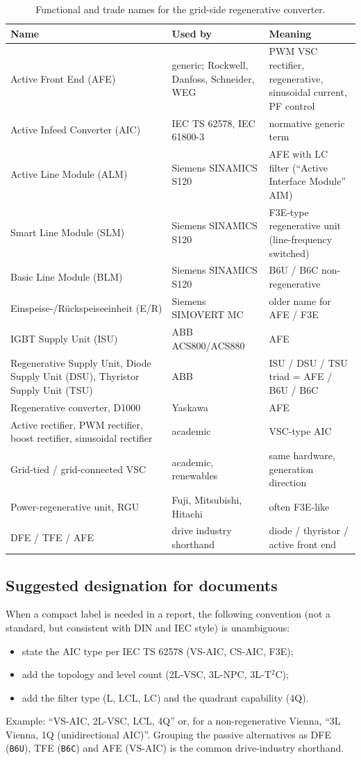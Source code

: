 \documentclass[11pt,a4paper]{article}
\newcommand{\code}[1]{\texttt{#1}}
\begin{document}
\begin{table}[htb]
\centering
\caption{Functional and trade names for the grid-side regenerative converter.}
\small
\begin{tabular}{p{4cm}p{3cm}p{7cm}}
\toprule
Name & Used by & Meaning \\
\midrule
Active Front End (AFE) & generic; Rockwell, Danfoss, Schneider, WEG & PWM VSC rectifier, regenerative, sinusoidal current, PF control \\
Active Infeed Converter (AIC) & IEC TS 62578, IEC 61800-3 & normative generic term \\
Active Line Module (ALM) & Siemens SINAMICS S120 & AFE with LC filter (``Active Interface Module'' AIM) \\
Smart Line Module (SLM) & Siemens SINAMICS S120 & F3E-type regenerative unit (line-frequency switched) \\
Basic Line Module (BLM) & Siemens SINAMICS S120 & B6U / B6C non-regenerative \\
Einspeise-/Rückspeiseeinheit (E/R) & Siemens SIMOVERT MC & older name for AFE / F3E \\
IGBT Supply Unit (ISU) & ABB ACS800/ACS880 & AFE \\
Regenerative Supply Unit, Diode Supply Unit (DSU), Thyristor Supply Unit (TSU) & ABB & ISU / DSU / TSU triad = AFE / B6U / B6C \\
Regenerative converter, D1000 & Yaskawa & AFE \\
Active rectifier, PWM rectifier, boost rectifier, sinusoidal rectifier & academic & VSC-type AIC \\
Grid-tied / grid-connected VSC & academic, renewables & same hardware, generation direction \\
Power-regenerative unit, RGU & Fuji, Mitsubishi, Hitachi & often F3E-like \\
DFE / TFE / AFE & drive industry shorthand & diode / thyristor / active front end \\
\bottomrule
\end{tabular}
\end{table}

\subsection{Suggested designation for documents}

When a compact label is needed in a report, the following convention (not a standard, but consistent with DIN and IEC style) is unambiguous:
\begin{itemize}
\item state the AIC type per IEC TS 62578 (VS-AIC, CS-AIC, F3E);
\item add the topology and level count (2L-VSC, 3L-NPC, 3L-T$^2$C);
\item add the filter type (L, LCL, LC) and the quadrant capability (4Q).
\end{itemize}
Example: ``VS-AIC, 2L-VSC, LCL, 4Q'' or, for a non-regenerative Vienna, ``3L Vienna, 1Q (unidirectional AIC)''. Grouping the passive alternatives as DFE (\code{B6U}), TFE (\code{B6C}) and AFE (VS-AIC) is the common drive-industry shorthand.
\end{document}
